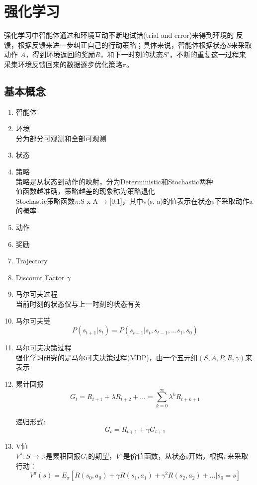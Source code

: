 \documentclass{book}
\begin{document}
\chapter{强化学习}
强化学习中智能体通过和环境互动不断地试错(trial and error)来得到环境的
反馈，根据反馈来进一步纠正自己的行动策略；具体来说，智能体根据状态$S$来采取动作
$A$，得到环境返回的奖励$R$，和下一时刻的状态$S'$，不断的重复这一过程来
采集环境反馈回来的数据逐步优化策略$\pi$。\\
\section{基本概念}
\begin{enumerate}
	\item 智能体
    \item 环境\\
    分为部分可观测和全部可观测
	\item 状态
	\item 策略\\
    策略是从状态到动作的映射，分为Deterministic和Stochastic两种\\
    值函数越准确，策略越差的现象称为策略退化\\
    Stochastic策略函数$\pi$:S x A → [0,1]，其中$\pi$(s, a)的值表示在状态s下采取动作a的概率
	\item 动作
	\item 奖励
	\item Trajectory
    \item Discount Factor $\gamma$   
	\item 马尔可夫过程\\
	当前时刻的状态仅与上一时刻的状态有关
	\item 马尔可夫链
	$$P\left(s_{t+1} | s_{t}\right)=P\left(s_{t+1} | s_{t}, s_{t-1}, \ldots s_{1}, s_{0}\right)$$
	\item 马尔可夫决策过程\\
    强化学习研究的是马尔可夫决策过程(MDP)，由一个五元组$(S,A,P,R,\gamma)$来表示
	\item 累计回报
	$$G_{t}=R_{t+1}+\lambda R_{t+2}+\ldots=\sum_{k=0}^{\infty} \lambda^{k} R_{t+k+1}$$\\
	递归形式:$$G_{t}=R_{t+1}+\gamma G_{t+1}$$
	\item V值\\
	$V^{\pi} : S \rightarrow \mathbb{R}$是累积回报$G_{t}$的期望，$V^{\pi}$是价值函数，从状态s开始，根据$\pi$来采取行动：
	$$V^{\pi}(s)=E_{\pi}\left[R\left(s_{0}, a_{0}\right)+\gamma R\left(s_{1}, a_{1}\right)+\gamma^{2} R\left(s_{2}, a_{2}\right)+\ldots | s_{0}=s\right]$$

\end{enumerate}
\end{document}
